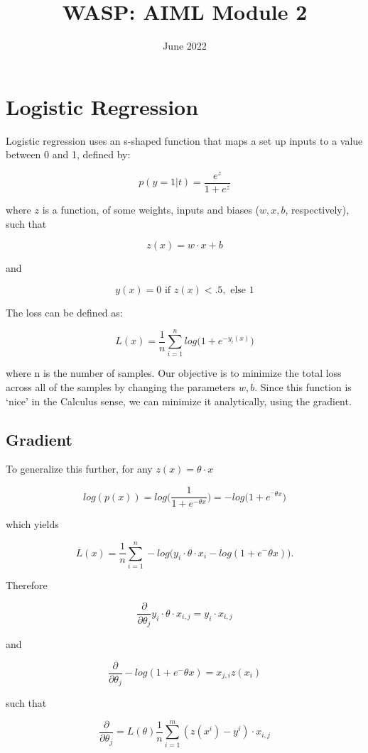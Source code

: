 \documentclass{article}
\title{WASP: AIML Module 2}
\date{June 2022}
\begin{document}
\maketitle

\section{Logistic Regression}
Logistic regression uses an s-shaped function that maps a set up inputs to a value between 0 and 1, defined by:

$$
p(y = 1| t) =  \frac{e^z}{1 + e^z}
$$

where $z$ is a function, of some weights, inputs and biases ($ w, x, b$, respectively), such that

$$
z(x) = w \cdot x + b
$$

and 

$$
y(x) = 0 \textrm{ if } z(x) < .5, \textrm{ else } 1
$$


The loss can be defined as:

$$
L(x) = \frac{1}{n} \sum_{i = 1}^n log \bigg( 1 + e ^{-y_i(x)} \bigg)
$$

where n is the number of samples. Our objective is to minimize the total loss across all of the samples by changing the parameters $w, b$. Since this function is `nice' in the Calculus sense, we can minimize it analytically, using the gradient.

\subsection{Gradient}

To generalize this further, for any $z(x) = \theta \cdot x$

$$
log(p(x)) = log \bigg( \frac{1}{1+e^{-\theta x}} \bigg)= -log \bigg( 1 + e^{^-\theta x} \bigg)
$$

which yields

$$
L(x) = \frac{1}{n} \sum_{i = 1}^n -log \bigg( y_i \cdot \theta \cdot  x_i -log(1 + e ^-\theta x)  \bigg).
$$

Therefore

$$
\frac{\partial}{\partial \theta_j} y_i \cdot \theta \cdot x_{i,j} = y_i \cdot x_{i,j}
$$

and 

$$
\frac{\partial}{\partial \theta_j} -log(1 + e ^-\theta x)  = x_{j,i}z(x_i)
$$

such that

$$
\frac{\partial}{\partial \theta_j} = L(\theta) \frac{1}{n} \sum_{i = 1}^m(z(x^i) - y^i) \cdot x_{i,j}
$$
\end{document}
